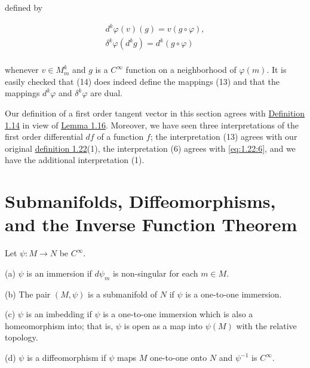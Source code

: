 defined by

\begin{equation}
	\tag{14}\label{eq:1.26:14}
	\begin{array}{c}{d^{k}\varphi(v)(g)=v(g\circ\varphi),}\\ {\delta^{k}\varphi(d^{k}g)=d^{k}(g\circ\varphi)}\\ \end{array}
\end{equation}

whenever $v\in M_{m}^{k}$ and $g$ is a $C^{\infty}$ function on a neighborhood of $\varphi(m)$. It is easily checked that (14) does indeed define the mappings (13) and that the mappings $d^{k}\varphi$ and $\delta^{k}\varphi$ are dual.

Our definition of a first order tangent vector in this section agrees with \hyperref[thm:1.14]{Definition 1.14} in view of \hyperref[thm:1.16]{Lemma 1.16}. Moreover, we have seen three interpretations of the first order differential $df$ of a function $f$; the interpretation (13) agrees with our original \hyperref[thm:1.22]{definition 1.22}(1), the interpretation (6) agrees with \eqref{eq:1.22:6}, and we have the additional interpretation (1).


\section{Submanifolds, Diffeomorphisms, and the Inverse Function Theorem}


\begin{definition}\label{thm:1.27}
	Let  $ \psi\colon M \to N $ be  $ C^\infty $. 

	(a)  $ \psi $ is an immersion if  $ d\psi_{m} $ is non-singular for each  $ m \in M $. 

	(b) The pair $(M,\psi)$ is a submanifold of $N$ if $\psi$ is a one-to-one immersion.

	(c)  $ \psi $ is an imbedding if  $ \psi $ is a one-to-one immersion which is also a homeomorphism into; that is,  $ \psi $ is open as a map into  $ \psi(M) $ with the relative topology. 

	(d)  $ \psi $ is a diffeomorphism if  $ \psi $ maps  $ M $ one-to-one onto  $ N $ and  $ \psi^{-1} $ is  $ C^\infty $. 

\end{definition}

